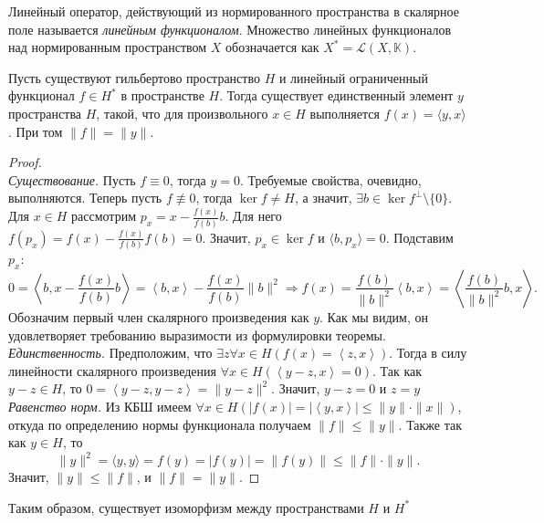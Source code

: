 \begin{definition} Линейный оператор, действующий из нормированного пространства в скалярное поле называется \textit{линейным функционалом}. Множество линейных функционалов над нормированным пространством $X$ обозначается как \(X^* = \mathcal{L}(X, \mathbb{K})\).
\end{definition}
\begin{theorem}\label{Riss-Freshe} Пусть существуют гильбертово пространство \(H\) и линейный ограниченный функционал \(f \in H^*\) в пространстве \(H\). Тогда существует единственный элемент \(y\) пространства \(H\), такой, что для произвольного \(x \in H\) выполняется \(f(x)=\langle y,x\rangle\). При том \(\|f\| = \|y\|\).
\end{theorem}
\begin{proof} \\
\textit{Существование.} Пусть \(f \equiv 0\), тогда \(y = 0\). Требуемые свойства, очевидно, выполняются. Теперь пусть \(f \not\equiv 0\), тогда \(\ker f \neq H\), а значит, \(\exists b \in \ker f^{\perp} \setminus \{0\}\). Для \(x \in H\) рассмотрим \(p_x = x - \frac{f(x)}{f(b)}b\). Для него \(f(p_x) = f(x) - \frac{f(x)}{f(b)}f(b) = 0\). Значит, \(p_x \in \ker f\) и \(\langle b, p_x \rangle = 0\). Подставим \(p_x\):
\[0 = \left\langle b, x - \frac{f(x)}{f(b)}b \right\rangle = \left\langle b, x \right\rangle - \frac{f(x)}{f(b)}\|b\|^2 \Rightarrow f(x) = \frac{f(b)}{\|b\|^2} \left\langle b, x \right\rangle = \left\langle \frac{f(b)}{\|b\|^2} b, x \right\rangle.\]
Обозначим первый член скалярного произведения как \(y\). Как мы видим, он удовлетворяет требованию выразимости из формулировки теоремы.
\\

\noindent\textit{Единственность.} Предположим, что \(\exists z \forall x \in H\left(f(x)= \left\langle z, x \right\rangle \right)\). Тогда в силу линейности скалярного произведения \(\forall x \in H \left(\left \langle y-z, x \right\rangle = 0 \right)\). Так как \(y-z \in H\), то \(0 = \left\langle y-z, y-z \right\rangle = \|y-z\|^2\). Значит, \(y-z = 0\) и \(z=y\)
\\

\noindent\textit{Равенство норм.} Из КБШ имеем \(\forall x \in H \left(|f(x)| = |\left\langle y, x \right\rangle| \leqslant \|y\| \cdot \|x\| \right)\), откуда по определению нормы функционала получаем \(\|f\| \leqslant \|y\|\). Также так как \(y \in H\), то \[\|y\|^2 = \langle y, y \rangle = f(y) = |f(y)| = \|f(y)\| \leqslant \|f\| \cdot \|y\|.\] Значит, \(\|y\| \leqslant \|f\|\), и \(\|f\| = \|y\|\).
\end{proof}

\begin{note}
Таким образом, существует изоморфизм между пространствами $H$ и $H^*$
\end{note}
